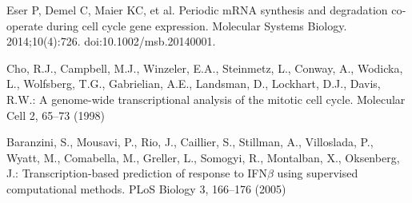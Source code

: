 \begin{thebibliography}{19}
Eser P, Demel C, Maier KC, et al. Periodic mRNA synthesis and degradation co‐operate during cell cycle gene expression. Molecular Systems Biology. 2014;10(4):726. doi:10.1002/msb.20140001.

Cho, R.J., Campbell, M.J., Winzeler, E.A., Steinmetz, L., Conway, A., Wodicka, L., Wolfsberg, T.G., Gabrielian, A.E., Landsman, D., Lockhart, D.J., Davis, R.W.: A genome-wide transcriptional analysis of the mitotic cell cycle. Molecular Cell 2, 65–73 (1998)

Baranzini, S., Mousavi, P., Rio, J., Caillier, S., Stillman, A., Villoslada, P., Wyatt, M., Comabella, M., Greller, L., Somogyi, R., Montalban, X., Oksenberg, J.: Transcription-based prediction of response to IFN$\beta$ using supervised computational methods. PLoS Biology 3, 166–176 (2005)

\end{thebibliography}